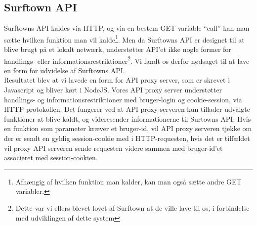 \documentclass[12pt]{article}
\begin{document}
\subsection{Surftown API}
Surftowns API kaldes via HTTP, og via en bestem GET variable ``call'' kan man sætte hvilken funktion man vil kalde\footnote{Afhængig af hvilken funktion man kalder, kan man også sætte andre GET variabler.}. 
Men da Surftowns API er designet til at blive brugt på et lokalt netwærk, understøtter API'et ikke nogle former for handlings- eller informationsrestriktioner\footnote{Dette var vi ellers blevet lovet af Surftown at de ville lave til os, i forbindelse med udviklingen af dette system}. Vi fandt os derfor nødsaget til at lave en form for udvidelse af Surftowns API.\\
Resultatet blev at vi lavede en form for API proxy server, som er skrevet i Javascript og bliver kørt i NodeJS. Vores API proxy server understøtter handlings- og informationsrestriktioner med bruger-login og cookie-session, via HTTP protokollen. Det fungerer ved at API proxy serveren kun tillader udvalgte funktioner at blive kaldt, og videresender informationerne til Surtowns API. Hvis en funktion som parameter kræver et bruger-id, vil API proxy serveren tjekke om der er sendt en gyldig session-cookie med i HTTP-requesten, hvis det er tilfældet vil proxy API serveren sende requesten videre sammen med bruger-id'et associeret med session-cookien.
\end{document}
